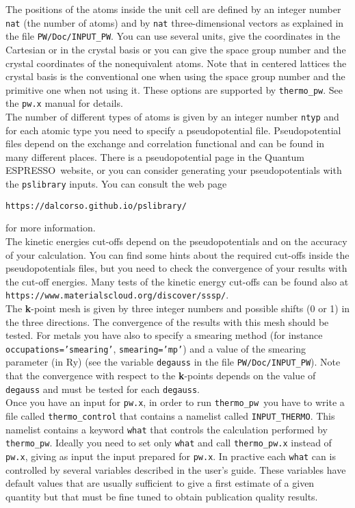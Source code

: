 \documentclass[12pt,a4paper]{article}
\def\qe{{\sc Quantum ESPRESSO}}
\def\thermo{\texttt{thermo\_pw}}
\begin{document}
The positions of the atoms inside the unit cell are defined by an integer
number \texttt{nat} (the number of atoms) and by \texttt{nat} 
three-dimensional vectors as explained in the file \texttt{PW/Doc/INPUT\_PW}.
You can use several units, give the coordinates in the Cartesian or in the
crystal basis or you can give the space group number and the
crystal coordinates of the nonequivalent atoms. Note that in centered lattices
the crystal basis is the conventional one when using the space group number
and the primitive one when not using it.
These options are supported by \thermo. See the \texttt{pw.x} manual
for details. \\

The number of different types of atoms is given by an integer number 
\texttt{ntyp} and for each atomic type you need to specify a 
pseudopotential file. Pseudopotential files depend on the exchange and 
correlation functional and can be found in many 
different places. There is a pseudopotential page in the \qe\ website, or 
you can consider generating your pseudopotentials with the \texttt{pslibrary} 
inputs. You can consult the web page 
\begin{center}
\texttt{https://dalcorso.github.io/pslibrary/} 
\end{center}
for more information. \\

The kinetic energies cut-offs depend on the pseudopotentials
and on the accuracy of your calculation. You can 
find some hints about the required cut-offs inside the pseudopotentials files,
but you need to check the convergence of your results with the cut-off 
energies. Many tests of the kinetic energy cut-offs can be found also at 
\texttt{https://www.materialscloud.org/discover/sssp/}. \\

The {\bf k}-point mesh is given by three integer numbers and possible
shifts (0 or 1) in the three directions. The convergence of the results
with this mesh should be tested. For metals you have also to specify a
smearing method (for instance \texttt{occupations='smearing'}, 
\texttt{smearing='mp'}) and a value of the smearing parameter (in Ry) 
(see the variable \texttt{degauss} in the file \texttt{PW/Doc/INPUT\_PW}). 
Note that the convergence with respect to the {\bf k}-points depends on
the value of \texttt{degauss} and must be tested for each \texttt{degauss}. \\

Once you have an input for \texttt{pw.x}, in order to run \thermo\ you
have to write a file called \texttt{thermo\_control} that contains a
namelist called \texttt{INPUT\_THERMO}. This namelist contains a keyword
\texttt{what} that controls the calculation performed by 
\thermo. Ideally you need to set only \texttt{what} and call 
\texttt{thermo\_pw.x} instead of \texttt{pw.x}, giving as input the 
input prepared for \texttt{pw.x}. In practive each \texttt{what} can
is controlled by several variables described in the user's guide.
These variables have default values that are usually sufficient to
give a first estimate of a given quantity but that must be fine tuned
to obtain publication quality results.
\end{document}
